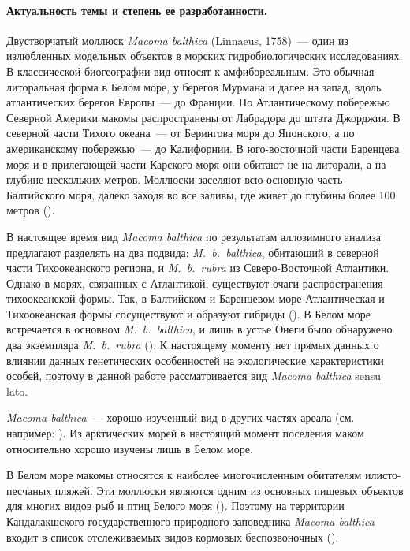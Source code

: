 \paragraph {Актуальность темы и степень ее разработанности.}
Двустворчатый моллюск {\it Macoma balthica} (Linnaeus, 1758)~--- один из излюбленных модельных объектов в морских гидробиологических исследованиях. 
В классической биогеографии вид относят к амфибореальным. 
Это обычная литоральная форма в Белом море, у берегов Мурмана и далее на запад, вдоль атлантических берегов Европы~--- до Франции. 
По Атлантическому побережью Северной Америки макомы распространены от Лабрадора до штата Джорджия. 
В северной части Тихого океана~--- от Берингова моря до Японского, а по американскому побережью~--- до Калифорнии. 
В юго-восточной части Баренцева моря и в прилегающей части Карского моря они обитают  не на литорали, а на глубине нескольких метров. 
Моллюски заселяют всю основную часть Балтийского моря, далеко заходя во все заливы, где живет до глубины более 100 метров (\cite{Zacepin_Filatova_1968}).

В настоящее время вид {\it Macoma balthica} по результатам аллозимного анализа предлагают разделять на два подвида: {\it M.~b.~balthica}, обитающий в северной части Тихоокеанского региона, и {\it M.~b.~rubra} из Северо-Восточной Атлантики. 
Однако  в морях, связанных с  Атлантикой, существуют очаги распространения тихоокеанской формы. 
Так, в Балтийском и Баренцевом море Атлантическая и Тихоокеанская формы сосуществуют и образуют гибриды (\cite{Vainola_2003}). 
В Белом море встречается в основном {\it M.~b.~balthica}, и лишь в устье Онеги было обнаружено два экземпляра {\it M.~b.~rubra} (\cite{Nikula_et_al_2007}).
К настоящему моменту нет прямых данных о влиянии данных генетических особенностей на экологические характеристики особей, поэтому в данной работе рассматривается вид {\it Macoma balthica} sensu lato.

{\it Macoma balthica}~--- хорошо изученный вид в других частях ареала (см. например: \cite{Segerstrale_1960, Lavoie_1970, Gilbert_1978, Vincent_et_al_1989, Hiddink_et_al_2002_predation_epifauna, Hiddink_et_al_2002_predation_infauna, Beukema_et_al_2009}). 
Из арктических морей в настоящий момент поселения маком относительно хорошо изучены лишь в Белом море.

В Белом море макомы относятся к наиболее многочисленным обитателям илисто-песчаных пляжей. 
Эти моллюски являются одним из основных пищевых объектов для многих видов рыб и птиц Белого моря (\cite{Azarov_1963, Percov_1963, Golcev_et_al_1997, Bianki_et_al_2003}). 
Поэтому на территории Кандалакшского государственного природного заповедника {\it Macoma balthica} входит в список отслеживаемых видов кормовых беспозвоночных (\cite{Nazarova_2003}).

